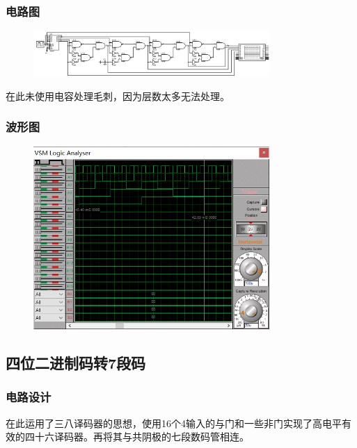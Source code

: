 \documentclass[UTF8, a4paper, 11pt]{article}
\begin{document}
\subsubsection{电路图}
\begin{figure}[H]
    \centering
    \includegraphics[width=0.8\textwidth]{ex3.2.jpg}
\end{figure}
在此未使用电容处理毛刺，因为层数太多无法处理。
\subsubsection{波形图}
\begin{figure}[H]
    \centering
    \includegraphics[width=0.8\textwidth]{ex3.2.png}
\end{figure}
\subsection{四位二进制码转7段码}
\subsubsection{电路设计}
在此运用了三八译码器的思想，使用16个4输入的与门和一些非门实现了高电平有效的四十六译码器。再将其与共阴极的七段数码管相连。
\end{document}
